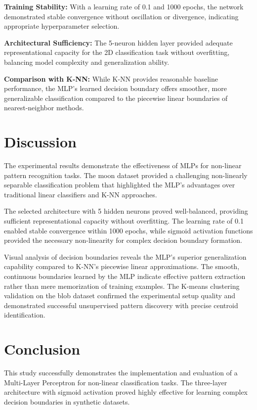 \documentclass[11pt,a4paper]{article}
\begin{document}
\textbf{Training Stability:} With a learning rate of 0.1 and 1000 epochs, the network demonstrated stable convergence without oscillation or divergence, indicating appropriate hyperparameter selection.

\textbf{Architectural Sufficiency:} The 5-neuron hidden layer provided adequate representational capacity for the 2D classification task without overfitting, balancing model complexity and generalization ability.

\textbf{Comparison with K-NN:} While K-NN provides reasonable baseline performance, the MLP's learned decision boundary offers smoother, more generalizable classification compared to the piecewise linear boundaries of nearest-neighbor methods.

\section{Discussion}

The experimental results demonstrate the effectiveness of MLPs for non-linear pattern recognition tasks. The moon dataset provided a challenging non-linearly separable classification problem that highlighted the MLP's advantages over traditional linear classifiers and K-NN approaches.

The selected architecture with 5 hidden neurons proved well-balanced, providing sufficient representational capacity without overfitting. The learning rate of 0.1 enabled stable convergence within 1000 epochs, while sigmoid activation functions provided the necessary non-linearity for complex decision boundary formation.

Visual analysis of decision boundaries reveals the MLP's superior generalization capability compared to K-NN's piecewise linear approximations. The smooth, continuous boundaries learned by the MLP indicate effective pattern extraction rather than mere memorization of training examples. The K-means clustering validation on the blob dataset confirmed the experimental setup quality and demonstrated successful unsupervised pattern discovery with precise centroid identification.

\section{Conclusion}

This study successfully demonstrates the implementation and evaluation of a Multi-Layer Perceptron for non-linear classification tasks. The three-layer architecture with sigmoid activation proved highly effective for learning complex decision boundaries in synthetic datasets.
\end{document}
